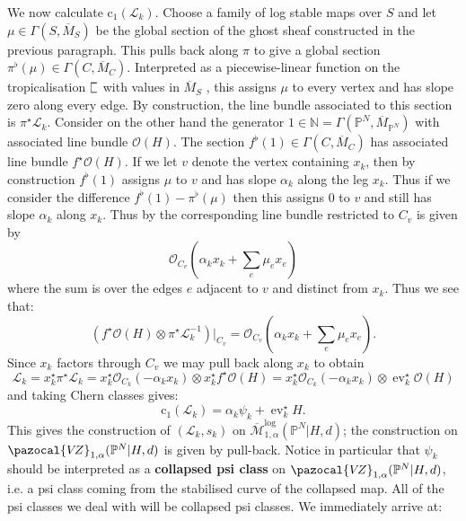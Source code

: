 \documentclass[11pt]{amsart}
\newcommand{\sqC}{\scalebox{0.8}[1.3]{$\sqsubset$}}
\newcommand{\MLog}{\overline{\mathcal{M}}^{\operatorname{log}}}
\newcommand{\PP}{\mathbb P}
\newcommand{\VZ}{\pazocal{V\!Z}}
\newcommand{\st}{\star}
\newcommand{\N}{\mathbb{N}}
\newcommand{\OO}{\mathcal{O}}
\newcommand{\ev}{\operatorname{ev}}
\newcommand{\Lcal}{\mathcal{L}}
\newcommand{\cchern}{\mathrm{c}}
\newcommand{\ol}[1]{\overline{#1}}
\theoremstyle{definition}
\theoremstyle{definition}
\begin{document}
We now calculate $\cchern_1(\Lcal_k)$. Choose a family of log stable maps over $S$ and let $\mu \in \Gamma(S,\ol{M}_S)$ be the global section of the ghost sheaf constructed in the previous paragraph. This pulls back along $\pi$ to give a global section $\pi^\flat(\mu) \in \Gamma(C,\ol{M}_C)$.  Interpreted as a piecewise-linear function on the tropicalisation $\sqC$ with values in $\ol{M}_S$ \cite[Remark 7.3]{CavalieriChanUlirschWise}, this assigns $\mu$ to every vertex and has slope zero along every edge. By construction, the line bundle associated to this section is $\pi^\st \Lcal_k$. Consider on the other hand the generator $1 \in \N = \Gamma(\PP^N,\ol{M}_{\PP^N})$ with associated line bundle $\OO(H)$. The section $f^\flat(1) \in \Gamma(C,\ol{M}_C)$ has associated line bundle $f^\st\OO(H)$. If we let $v$ denote the vertex containing $x_k$, then by construction $f^\flat(1)$ assigns $\mu$ to $v$ and has slope $\alpha_k$ along the leg $x_k$. Thus if we consider the difference $f^\flat(1) - \pi^\flat(\mu)$ then this assigns $0$ to $v$ and still has slope $\alpha_k$ along $x_k$. Thus by \cite[Proposition 2.4.1]{RSPW} the corresponding line bundle restricted to $C_v$ is given by
\begin{equation*} \OO_{C_v} \left(\alpha_k x_k + \sum_e \mu_e x_e \right) \end{equation*}
where the sum is over the edges $e$ adjacent to $v$ and distinct from $x_k$. Thus we see that:
\begin{equation*} \left( f^\st\OO(H) \otimes \pi^\st \Lcal_k^{-1} \right) \big|_{C_v} = \OO_{C_v} \left(\alpha_k x_k + \sum_e \mu_e x_e \right).\end{equation*}
Since $x_k$ factors through $C_v$ we may pull back along $x_k$ to obtain
\begin{equation*} \Lcal_k = x_k^\st\pi^\st \Lcal_k = x_k^\st \OO_{C_k}(-\alpha_k x_k) \otimes x_k^\st f^\st\OO(H) = x_k^\st \OO_{C_k}(-\alpha_k x_k) \otimes \ev_k^\st \OO(H) \end{equation*}
and taking Chern classes gives:
\begin{equation*} \cchern_1(\Lcal_k) = \alpha_k \psi_k + \ev_k^\st H.\end{equation*}
This gives the construction of $(\Lcal_k,s_k)$ on $\MLog_{1,\alpha}(\PP^N|H,d)$; the construction on $\VZ_{1,\alpha}(\PP^N|H,d)$ is given by pull-back. Notice in particular that $\psi_k$ should be interpreted as a \textbf{collapsed psi class} on $\VZ_{1,\alpha}(\PP^N|H,d)$, i.e. a psi class coming from the stabilised curve of the collapsed map. All of the psi classes we deal with will be collapsed psi classes. We immediately arrive at:
\end{document}

